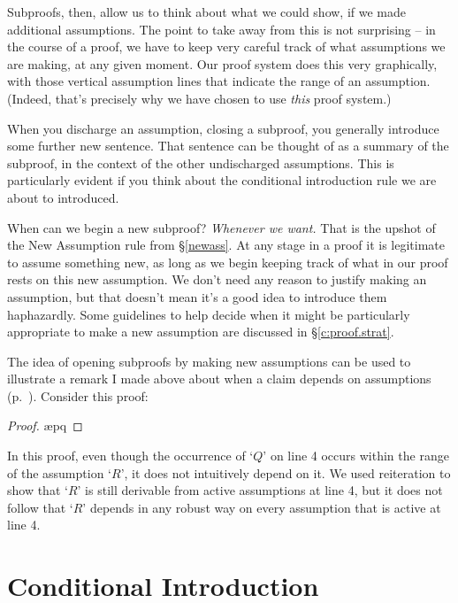 Subproofs, then, allow us to think about what we could show, if we made additional assumptions. The point to take away from this is not surprising – in the course of a proof, we have to keep very careful track of what assumptions we are making, at any given moment. Our proof system does this very graphically, with those vertical assumption lines that indicate the range of an assumption. (Indeed, that's precisely why we have chosen to use \emph{this} proof system.) 

When you discharge an assumption, closing a subproof, you generally introduce some further new sentence. That sentence can be thought of as a summary of the subproof, in the context of the other undischarged assumptions. This is particularly evident if you think about the conditional introduction rule we are about to introduced.

When can we begin a new subproof? \emph{Whenever we want.} That is the upshot of the New Assumption rule from §\ref{newass}. At any stage in a proof it is legitimate to assume something new, as long as we begin keeping track of what in our proof rests on this new assumption. We don't need any reason to justify making an assumption, but that doesn't mean it's a good idea to introduce them  
haphazardly. Some guidelines to help decide when it might be particularly appropriate to make a new assumption are discussed in §\ref{c:proof.strat}.

The idea of opening subproofs by making new assumptions can be used to illustrate a remark I made above about when a claim depends on assumptions (p.\ \pageref{nondependence}). Consider this proof: \begin{proof}
	\ae{pq}
	\open {}
\end{proof} In this proof, even though the occurrence of `$Q$' on line 4 occurs within the range of the assumption `$R$', it does not intuitively depend on it. We used reiteration to show that `$R$' is still derivable from active assumptions at line 4, but it does not follow that `$R$' depends in any robust way on every assumption that is active at line 4. 

\section{Conditional Introduction}\label{condint}

